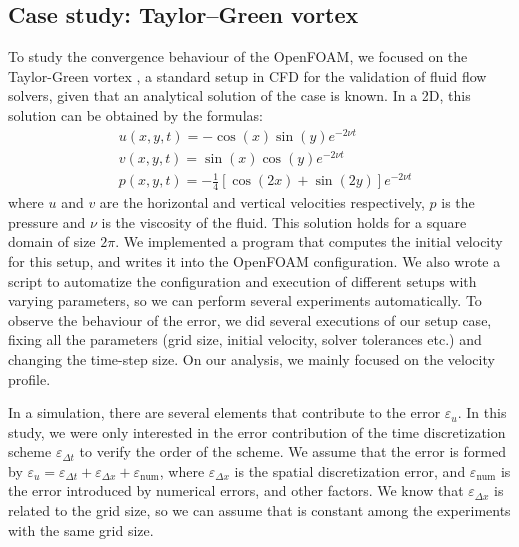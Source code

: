 \documentclass[
  english,        %
  font=times,     %
  onecolumn,      %
]{tumarticle}
\begin{document}
\subsection{Case study: Taylor–Green vortex}

To study the convergence behaviour of the OpenFOAM, we focused on the Taylor-Green vortex \cite{taylor1937mechanism, chorin1968numerical}, a standard setup in CFD for the validation of fluid flow solvers, given that an analytical solution of the case is known. In a 2D, this solution can be obtained by the formulas:
\begin{align}
    &u(x, y, t) = -\cos(x) \sin(y) e^{-2\nu t} \\
    &v(x, y, t) = \sin(x) \cos(y) e^{-2\nu t} \\
    &p(x, y, t) = -\frac{1}{4}\left[\cos(2x) + \sin(2y)\right]e^{-2\nu t}
\end{align}
where $u$ and $v$ are the horizontal and vertical velocities respectively, $p$ is the pressure and $\nu$ is the viscosity of the fluid. This solution holds for a square domain of size $2\pi$. 
We implemented a program that computes the initial velocity for this setup, and writes it into the OpenFOAM configuration. We also wrote a script to automatize the configuration and execution of different setups with varying parameters, so we can perform several experiments automatically.
To observe the behaviour of the error, we did several executions of our setup case, fixing all the parameters (grid size, initial velocity, solver tolerances etc.) and changing the time-step size. On our analysis, we mainly focused on the velocity profile.

In a simulation, there are several elements that contribute to the error $\varepsilon_{u}$. In this study, we were only interested in the error contribution of the time discretization scheme $\varepsilon_{\Delta t}$ to verify the order of the scheme. We assume that the error is formed by $\varepsilon_u = \varepsilon_{\Delta t} + \varepsilon_{\Delta x} + \varepsilon_\text{num}$, where $\varepsilon_{\Delta x}$ is the spatial discretization error, and $\varepsilon_\text{num}$ is the error introduced by numerical errors, and other factors. We know that $\varepsilon_{\Delta x}$ is related to the grid size, so we can assume that is constant among the experiments with the same grid size.
\end{document}
